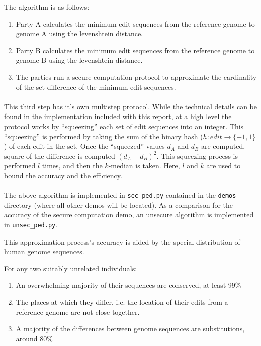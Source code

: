 The algorithm is as follows:

\begin{enumerate}
\item Party A calculates the minimum edit sequences from the reference genome to genome A using the levenshtein distance.
\item Party B calculates the minimum edit sequences from the reference genome to genome B using the levenshtein distance.
\item The parties run a secure computation protocol to approximate the cardinality of the set difference of the minimum edit sequences.
\end{enumerate}

\paragraph{}
This third step has it's own multistep protocol. While the technical details can be found in the implementation included with this report, at a high level the protocol works by ``squeezing'' each set of edit sequences into an integer. This ``squeezing'' is performed by taking the sum of the binary hash ($h : edit \rightarrow \{-1, 1\}$) of each edit in the set. Once the ``squeezed'' values $d_A$ and $d_B$ are computed, square of the difference is computed $(d_A - d_B)^2$. This squeezing process is performed $l$ times, and then the $k$-median is taken. Here, $l$ and $k$ are used to bound the accuracy and the efficiency.

\paragraph{}
The above algorithm is implemented in \texttt{sec\_ped.py} contained in the \texttt{demos} directory (where all other demos will be located). As a comparison for the accuracy of the secure computation demo, an unsecure algorithm is implemented in \texttt{unsec\_ped.py}.

This approximation process's accuracy is aided by the special distribution of human genome sequences.

For any two suitably unrelated individuals:

\begin{enumerate}
\item An overwhelming majority of their sequences are conserved, at least 99\%
\item The places at which they differ, i.e. the location of their edits from a reference genome are not close together.
\item A majority of the differences between genome sequences are substitutions, around 80\%
\end{enumerate}

